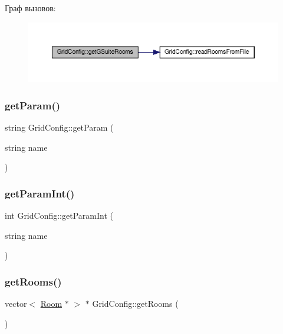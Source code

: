 Граф вызовов\+:\nopagebreak
\begin{figure}[H]
\begin{center}
\leavevmode
\includegraphics[width=350pt]{class_grid_config_af0f79f5721c69162bebeeac5e3bdcf03_cgraph}
\end{center}
\end{figure}
\mbox{\label{class_grid_config_a2f3515d56ac52c5da67d1e181808404a}} 
\subsubsection{\texorpdfstring{get\+Param()}{getParam()}}
{\footnotesize\ttfamily string Grid\+Config\+::get\+Param (\begin{DoxyParamCaption}\item[{string}]{name }\end{DoxyParamCaption})}

\mbox{\label{class_grid_config_ac9df22f86cdb7d1c51b2273640aefc99}} 
\subsubsection{\texorpdfstring{get\+Param\+Int()}{getParamInt()}}
{\footnotesize\ttfamily int Grid\+Config\+::get\+Param\+Int (\begin{DoxyParamCaption}\item[{string}]{name }\end{DoxyParamCaption})}

\mbox{\label{class_grid_config_a98f5a1bb1b4fc28cf7b5d1bc931f5a54}} 
\subsubsection{\texorpdfstring{get\+Rooms()}{getRooms()}}
{\footnotesize\ttfamily vector$<$ \hyperlink{class_room}{Room} $\ast$ $>$ $\ast$ Grid\+Config\+::get\+Rooms (\begin{DoxyParamCaption}{ }\end{DoxyParamCaption})}

